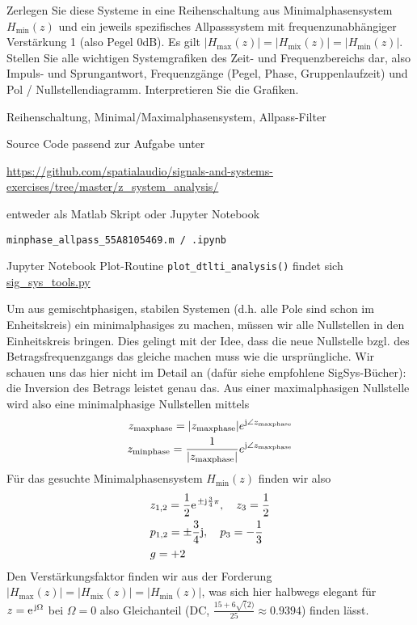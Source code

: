 Zerlegen Sie diese Systeme in eine Reihenschaltung aus Minimalphasensystem
$H_\mathrm{min}(z)$
und ein jeweils spezifisches Allpasssystem mit frequenzunabhängiger
Verstärkung 1 (also Pegel 0dB).
Es gilt $|H_\mathrm{max}(z)| = |H_\mathrm{mix}(z)| = |H_\mathrm{min}(z)|$.
%
Stellen Sie alle wichtigen Systemgrafiken des Zeit- und Frequenzbereichs dar,
also Impuls- und Sprungantwort, Frequenzgänge (Pegel, Phase, Gruppenlaufzeit)
und Pol / Nullstellendiagramm.
%
Interpretieren Sie die Grafiken.



\begin{Werkzeug}
Reihenschaltung, Minimal/Maximalphasensystem, Allpass-Filter

Source Code passend zur Aufgabe unter

\url{https://github.com/spatialaudio/signals-and-systems-exercises/tree/master/z_system_analysis/}

entweder als Matlab Skript oder Jupyter Notebook

\texttt{minphase\_allpass\_55A8105469.m / .ipynb}

Jupyter Notebook Plot-Routine \texttt{plot\_dtlti\_analysis()} findet sich
\url{sig_sys_tools.py}


\end{Werkzeug}
\begin{Ansatz}
Um aus gemischtphasigen, stabilen Systemen (d.h. alle Pole sind schon im Enheitskreis)
ein minimalphasiges zu machen, müssen wir
alle Nullstellen in den Einheitskreis bringen. Dies gelingt mit der Idee, dass
die neue Nullstelle bzgl. des Betragsfrequenzgangs
das gleiche machen muss wie die ursprüngliche.
Wir schauen uns das hier nicht im Detail an (dafür siehe empfohlene SigSys-Bücher):
die Inversion des Betrags leistet genau das. Aus einer maximalphasigen Nullstelle
wird also eine minimalphasige Nullstellen mittels
\begin{align}
z_\mathrm{maxphase} = |z_\mathrm{maxphase}| e^{\im\angle z_\mathrm{maxphase}}\\
 z_\mathrm{minphase} = \frac{1}{|z_\mathrm{maxphase}|} e^{\im\angle z_\mathrm{maxphase}}
\end{align}
%
Für das gesuchte Minimalphasensystem $H_\mathrm{min}(z)$ finden wir also
\begin{align}
&z_{1,2} = \frac{1}{2} \e^{\pm\im\frac{3}{4}\pi},\quad z_3 = \frac{1}{2}\\
&p_{1,2} = \pm\frac{3}{4}\im,\quad p_3 = -\frac{1}{3}\\
&g = +2
\end{align}
Den Verstärkungsfaktor finden wir aus der Forderung
$|H_\mathrm{max}(z)| = |H_\mathrm{mix}(z)| = |H_\mathrm{min}(z)|$, was
sich hier halbwegs elegant für $z=\e^{\im \Omega}$ bei $\Omega=0$ also Gleichanteil
(DC, $\frac{15+6\sqrt(2)}{25} \approx 0.9394$) finden lässt.
%
\end{Ansatz}
